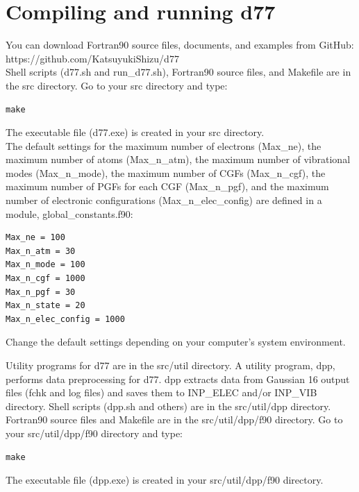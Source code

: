 ﻿\documentclass[11pt,a4paper,openany]{article}
\begin{document}
\clearpage
\section{Compiling and running  d77}
\noindent
You can download Fortran90 source files, documents, and examples from 
GitHub:\cite{d77}\\
https://github.com/KatsuyukiShizu/d77\\
Shell scripts (d77.sh and run\_d77.sh), Fortran90 source files, and Makefile are in the src directory.
Go to your src directory and type:
\begin{verbatim}
make
\end{verbatim}
The executable file (d77.exe) is created in your src directory.\\

The default settings for 
the maximum number of electrons (Max\_ne),
the maximum number of atoms (Max\_n\_atm), 
the maximum number of vibrational modes (Max\_n\_mode),
the maximum number of CGFs (Max\_n\_cgf),
the maximum number of PGFs for each CGF (Max\_n\_pgf), 
and
the maximum number of electronic configurations (Max\_n\_elec\_config) 
are defined in a module, global\_constants.f90:
\begin{verbatim}
Max_ne = 100
Max_n_atm = 30
Max_n_mode = 100
Max_n_cgf = 1000
Max_n_pgf = 30
Max_n_state = 20
Max_n_elec_config = 1000
\end{verbatim}
Change the default settings depending on your computer's system environment.

Utility programs for d77 are in the src/util directory. 
A utility program, dpp, performs data preprocessing for d77.
dpp extracts data from Gaussian 16 output files (fchk and log files) and
saves them to INP\_ELEC and/or INP\_VIB directory. 
Shell scripts (dpp.sh and others) are in the src/util/dpp directory. 
Fortran90 source files and Makefile are in the src/util/dpp/f90 directory. 
Go to your src/util/dpp/f90 directory and type:
\begin{verbatim}
make
\end{verbatim}
The executable file (dpp.exe) is created in your src/util/dpp/f90 directory.\\
\end{document}
